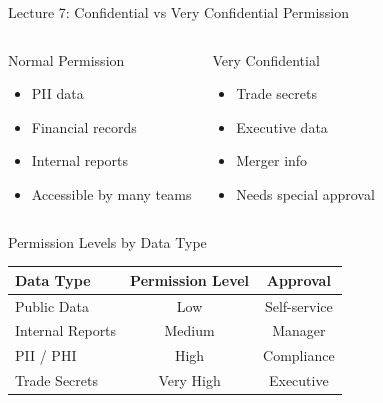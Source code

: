 \documentclass{beamer}
\begin{document}
	\begin{frame}{Lecture 7: Confidential vs Very Confidential Permission}
		\begin{columns}[T]
			\begin{block}{Normal Permission}
				\begin{itemize}
					\item PII data
					\item Financial records
					\item Internal reports
					\item Accessible by many teams
				\end{itemize}
			\end{block}
			
			\begin{alertblock}{Very Confidential}
				\begin{itemize}
					\item Trade secrets
					\item Executive data
					\item Merger info
					\item Needs special approval
				\end{itemize}
			\end{alertblock}
		\end{columns}
	\end{frame}
	
	\begin{frame}{Permission Levels by Data Type}
		\begin{center}
			\begin{tabular}{|l|c|c|}
				\hline
				\textbf{Data Type} & \textbf{Permission Level} & \textbf{Approval} \\
				\hline
				Public Data & Low & Self-service \\
				\hline
				Internal Reports & Medium & Manager \\
				\hline
				PII / PHI & High & Compliance \\
				\hline
				Trade Secrets & Very High & Executive \\
				\hline
			\end{tabular}
		\end{center}
	\end{frame}
	
\end{document}
